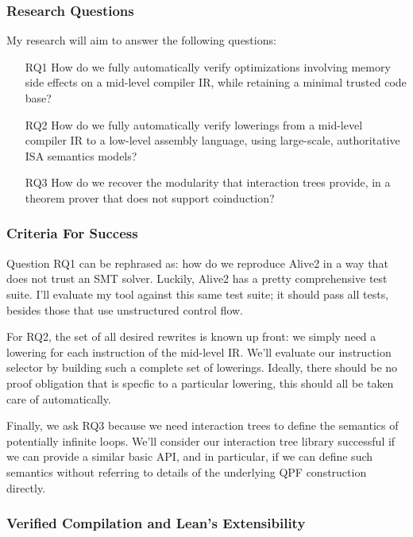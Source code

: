 \documentclass[a4paper]{scrartcl}
\begin{document}
\subsubsection*{Research Questions}

My research will aim to answer the following questions:
\begin{enumerate}
  \item[\textsc{RQ1}]\label{research-question-1}
    How do we fully automatically verify optimizations involving memory side effects on a mid-level compiler IR, 
    while retaining a minimal trusted code base?

  \item[\textsc{RQ2}]
    How do we fully automatically verify lowerings from a mid-level compiler IR
  to a low-level assembly language, using large-scale, authoritative ISA semantics models?

  \item[\textsc{RQ3}] 
    How do we recover the modularity that interaction trees provide,
      in a theorem prover that does not support coinduction?
\end{enumerate}

\subsubsection*{Criteria For Success}

Question \textsc{RQ1} can be rephrased as: 
how do we reproduce Alive2 in a way that does not trust an SMT solver. 
Luckily, Alive2 has a pretty comprehensive test suite.
I'll evaluate my tool against this same test suite; it should pass all tests,
besides those that use unstructured control flow.

For \textsc{RQ2}, the set of all desired rewrites is known up front: we simply 
need a lowering for each instruction of the mid-level IR.
We'll evaluate our instruction selector by building such a complete set of lowerings.
Ideally, there should be no proof obligation that is specfic to a particular lowering,
this should all be taken care of automatically.

Finally, we ask \textsc{RQ3} because we need interaction trees to define the semantics
of potentially infinite loops. 
We'll consider our interaction tree library successful if
we can provide a similar basic API, and in particular, if we can define such semantics
without referring to details of the underlying QPF construction directly.

\subsubsection*{Verified Compilation and Lean's Extensibility}
\end{document}
